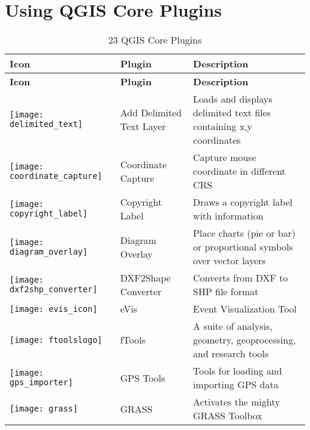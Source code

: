 
\chapter{Using QGIS Core Plugins}\label{sec:core_plugins}



{\setlength{\extrarowheight}{15pt}
\small
\begin{longtable}{|l|l|p{8cm}|}
\caption{23 QGIS Core Plugins}\label{tab:core_plugins} \\
\hline
 \textbf{Icon} & \textbf{Plugin} & \textbf{Description}\\
\endfirsthead
\hline
\textbf{Icon} & \textbf{Plugin} & \textbf{Description}\\
\endhead
\hline
\texttt{[image: delimited\_text]}
 & Add Delimited Text Layer \index{plugins!delimited text} & Loads and displays delimited text files containing x,y coordinates\\
\hline
\texttt{[image: coordinate\_capture]}
 & Coordinate Capture \index{plugins!coordinate capture}& Capture mouse coordinate in different CRS\\
\hline 
\texttt{[image: copyright\_label]}
 & Copyright Label \index{plugins!copyright}& Draws a copyright label with information\\
\hline
\texttt{[image: diagram\_overlay]}
 & Diagram Overlay \index{plugins!diagram}& Place charts (pie or bar) or proportional symbols over vector layers\\
\hline
\texttt{[image: dxf2shp\_converter]}
 & DXF2Shape Converter \index{plugins!DXF2Shape}& Converts from DXF to SHP file format\\
\hline
\texttt{[image: evis\_icon]}
 & eVis & Event Visualization Tool \\
\hline
\texttt{[image: ftoolslogo]}
 & fTools \index{plugins!ftools}& A suite of analysis, geometry, geoprocessing, and research tools\\
\hline
\texttt{[image: gps\_importer]}
 & GPS Tools \index{plugins!gps}& Tools for loading and importing GPS data\\
\hline
\texttt{[image: grass]}
 & GRASS \index{plugin!grass toolbox} & Activates the mighty GRASS Toolbox\\

\end{longtable}}
